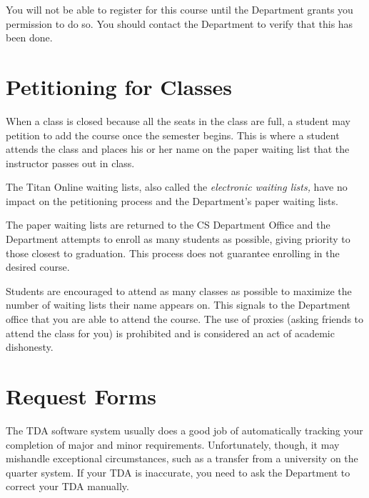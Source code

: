 \documentclass{book}
\begin{document}
You will not be able to register for this course until the Department
grants you permission to do so. You should contact the Department to
verify that this has been done.

\section{Petitioning for Classes}

When a class is closed because all the seats in the class are full, a
student may petition to add the course once the semester begins. This
is where a student attends the class and places his or her name on the
paper waiting list that the instructor passes out in class.

The Titan Online waiting lists, also called the \emph{electronic
  waiting lists,} have no impact on the petitioning process and the
Department's paper waiting lists.

The paper waiting lists are returned to the CS Department Office and
the Department attempts to enroll as many students as possible, giving
priority to those closest to graduation. This process does not
guarantee enrolling in the desired course.

Students are encouraged to attend as many classes as possible to
maximize the number of waiting lists their name appears on. This
signals to the Department office that you are able to attend the
course. The use of proxies (asking friends to attend the class for
you) is prohibited and is considered an act of academic dishonesty.

\section{Request Forms}
\label{section:request_forms}

The TDA software system usually does a good job of automatically
tracking your completion of major and minor
requirements. Unfortunately, though, it may mishandle exceptional
circumstances, such as a transfer from a university on the quarter
system. If your TDA is inaccurate, you need to ask the Department to
correct your TDA manually.
\end{document}

